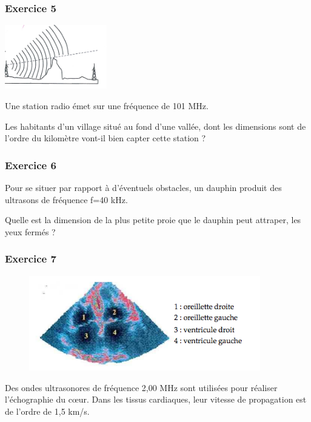 {\subsubsection{Exercice 5}

\includegraphics[width=4.445cm,height=2.787cm]{Pictures/10000001000002E4000001CE9CDB74834F100431.png}

Une
station radio émet sur une fréquence de 101 MHz.

Les habitants d'un village situé au fond d'une vallée, dont les
dimensions sont de l'ordre du kilomètre vont-il bien capter cette
station ?

\subsubsection{Exercice 6}

Pour se situer par rapport à d'éventuels obstacles, un dauphin produit
des ultrasons de fréquence f=40 kHz.

Quelle est la dimension de la plus petite proie que le dauphin peut
attraper, les yeux fermés ?

\subsubsection{Exercice 7 }

\begin{figure}
\centering
\includegraphics[width=10.084cm,height=4.142cm]{Pictures/10000001000001D1000000BF0020819CCFE94127.png}
\caption{}
\end{figure}

Des ondes ultrasonores de fréquence 2,00 MHz sont utilisées pour
réaliser l'échographie du cœur. Dans les tissus cardiaques, leur vitesse
de propagation est de l'ordre de 1,5 km/s.

}

